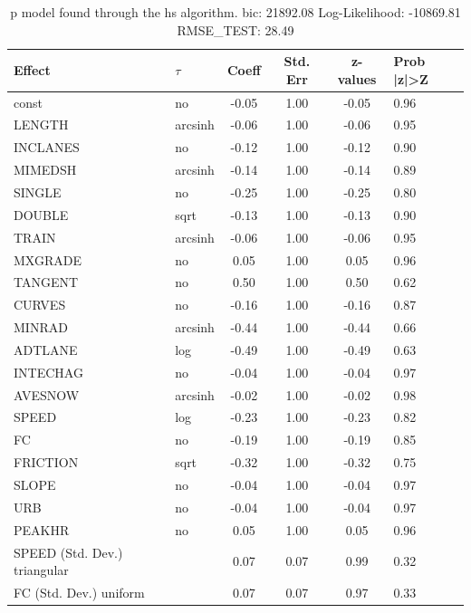 \begin{table}
	\caption{p model found through the hs algorithm. bic: 21892.08 Log-Likelihood: -10869.81 RMSE_TEST: 28.49}
	\begin{center}
		\begin{tabular}{|l|l|c|c|c|l|}
			\hline
			Effect & $\tau$ & Coeff & Std. Err & z-values & Prob |z|>Z \\
			\hline
			const & no & -0.05 & 1.00 & -0.05 & 0.96 \\
			\hline
			LENGTH & arcsinh & -0.06 & 1.00 & -0.06 & 0.95 \\
			\hline
			INCLANES & no & -0.12 & 1.00 & -0.12 & 0.90 \\
			\hline
			MIMEDSH & arcsinh & -0.14 & 1.00 & -0.14 & 0.89 \\
			\hline
			SINGLE & no & -0.25 & 1.00 & -0.25 & 0.80 \\
			\hline
			DOUBLE & sqrt & -0.13 & 1.00 & -0.13 & 0.90 \\
			\hline
			TRAIN & arcsinh & -0.06 & 1.00 & -0.06 & 0.95 \\
			\hline
			MXGRADE & no & 0.05 & 1.00 & 0.05 & 0.96 \\
			\hline
			TANGENT & no & 0.50 & 1.00 & 0.50 & 0.62 \\
			\hline
			CURVES & no & -0.16 & 1.00 & -0.16 & 0.87 \\
			\hline
			MINRAD & arcsinh & -0.44 & 1.00 & -0.44 & 0.66 \\
			\hline
			ADTLANE & log & -0.49 & 1.00 & -0.49 & 0.63 \\
			\hline
			INTECHAG & no & -0.04 & 1.00 & -0.04 & 0.97 \\
			\hline
			AVESNOW & arcsinh & -0.02 & 1.00 & -0.02 & 0.98 \\
			\hline
			SPEED & log & -0.23 & 1.00 & -0.23 & 0.82 \\
			\hline
			FC & no & -0.19 & 1.00 & -0.19 & 0.85 \\
			\hline
			FRICTION & sqrt & -0.32 & 1.00 & -0.32 & 0.75 \\
			\hline
			SLOPE & no & -0.04 & 1.00 & -0.04 & 0.97 \\
			\hline
			URB & no & -0.04 & 1.00 & -0.04 & 0.97 \\
			\hline
			PEAKHR & no & 0.05 & 1.00 & 0.05 & 0.96 \\
			\hline
			SPEED (Std. Dev.) triangular &  & 0.07 & 0.07 & 0.99 & 0.32 \\
			\hline
			FC (Std. Dev.) uniform &  & 0.07 & 0.07 & 0.97 & 0.33 \\

\end{tabular}
\end{center}
\end{table}
